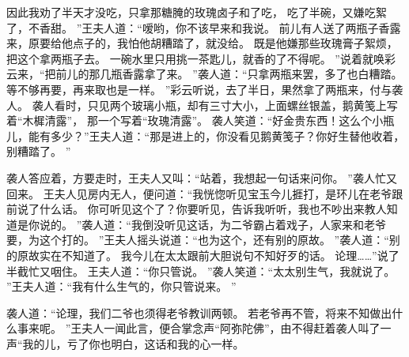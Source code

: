 因此我劝了半天才没吃，只拿那糖腌的玫瑰卤子和了吃，
吃了半碗，又嫌吃絮了，不香甜。
”王夫人道：“嗳哟，你不该早来和我说。
前儿有人送了两瓶子香露来，原要给他点子的，我怕他胡糟踏了，就没给。
既是他嫌那些玫瑰膏子絮烦，把这个拿两瓶子去。
一碗水里只用挑一茶匙儿，就香的了不得呢。
”说着就唤彩云来，“把前儿的那几瓶香露拿了来。
”袭人道：“只拿两瓶来罢，多了也白糟踏。
等不够再要，再来取也是一样。
”彩云听说，去了半日，果然拿了两瓶来，付与袭人。
袭人看时，只见两个玻璃小瓶，却有三寸大小，上面螺丝银盖，鹅黄笺上写着“木樨清露”，
那一个写着“玫瑰清露”。
袭人笑道：“好金贵东西！这么个小瓶儿，能有多少？”王夫人道：“那是进上的，你没看见鹅黄笺子？你好生替他收着，别糟踏了。
”\par
袭人答应着，方要走时，王夫人又叫：“站着，我想起一句话来问你。
”袭人忙又回来。
王夫人见房内无人，便问道：“我恍惚听见宝玉今儿捱打，是环儿在老爷跟前说了什么话。
你可听见这个了？你要听见，告诉我听听，我也不吵出来教人知道是你说的。
”袭人道：“我倒没听见这话，为二爷霸占着戏子，人家来和老爷要，为这个打的。
”王夫人摇头说道：“也为这个，还有别的原故。
”袭人道：“别的原故实在不知道了。
我今儿在太太跟前大胆说句不知好歹的话。
论理……”说了半截忙又咽住。
王夫人道：“你只管说。
”袭人笑道：“太太别生气，我就说了。
”王夫人道：“我有什么生气的，你只管说来。
”\par
袭人道：“论理，我们二爷也须得老爷教训两顿。
若老爷再不管，将来不知做出什么事来呢。
”王夫人一闻此言，便合掌念声“阿弥陀佛”，由不得赶着袭人叫了一声“我的儿，亏了你也明白，这话和我的心一样。
